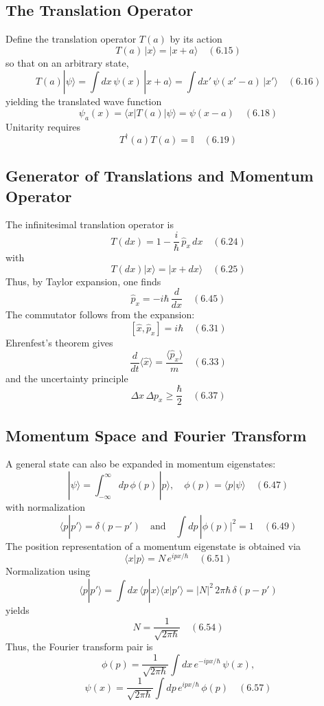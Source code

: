 \documentclass[twocolumn]{article}
\begin{document}
\begin{spacing}{1}
\subsection{The Translation Operator}
Define the translation operator $T(a)$ by its action
\[
T(a)\,|x\rangle = |x+a\rangle \quad (6.15)
\]
so that on an arbitrary state,
\[
T(a)|\psi\rangle = \int dx\, \psi(x)\, |x+a\rangle = \int dx'\,\psi(x'-a)\, |x'\rangle \quad (6.16)
\]
yielding the translated wave function
\[
\psi_a(x)=\langle x|T(a)|\psi\rangle=\psi(x-a) \quad (6.18)
\]
Unitarity requires 
\[
T^\dagger(a)T(a)=\mathbb{I} \quad (6.19)
\]

\subsection{Generator of Translations and Momentum Operator}
The infinitesimal translation operator is
\[
T(dx)= 1 -\frac{i}{\hbar}\,\hat{p}_x\,dx \quad (6.24)
\]
with
\[
T(dx)|x\rangle = |x+dx\rangle \quad (6.25)
\]
Thus, by Taylor expansion, one finds
\[
\hat{p}_x = -i\hbar\,\frac{d}{dx} \quad (6.45)
\]
The commutator follows from the expansion:
\[
[\hat{x},\hat{p}_x] = i\hbar \quad (6.31)
\]
Ehrenfest's theorem gives
\[
\frac{d}{dt}\langle \hat{x}\rangle = \frac{\langle \hat{p}_x\rangle}{m} \quad (6.33)
\]
and the uncertainty principle
\[
\Delta x\,\Delta p_x \ge \frac{\hbar}{2} \quad (6.37)
\]

\subsection{Momentum Space and Fourier Transform}
A general state can also be expanded in momentum eigenstates:
\[
|\psi\rangle = \int_{-\infty}^{\infty} dp\, \phi(p)\,|p\rangle,\quad \phi(p)=\langle p|\psi\rangle \quad (6.47)
\]
with normalization 
\[
\langle p|p'\rangle = \delta(p-p')\quad \text{and}\quad \int dp\,|\phi(p)|^2=1 \quad (6.49)
\]
The position representation of a momentum eigenstate is obtained via
\[
\langle x|p\rangle = N\, e^{ipx/\hbar} \quad (6.51)
\]
Normalization using
\[
\langle p|p'\rangle = \int dx\, \langle p|x\rangle \langle x|p'\rangle = |N|^2 \, 2\pi\hbar\, \delta(p-p')
\]
yields
\[
N = \frac{1}{\sqrt{2\pi\hbar}} \quad (6.54)
\]
Thus, the Fourier transform pair is
\[
\phi(p)= \frac{1}{\sqrt{2\pi\hbar}} \int dx\, e^{-ipx/\hbar}\,\psi(x),
\]
\[
 \psi(x)= \frac{1}{\sqrt{2\pi\hbar}} \int dp\, e^{ipx/\hbar}\,\phi(p) \quad (6.57)
\]


\end{spacing}
\end{document}
